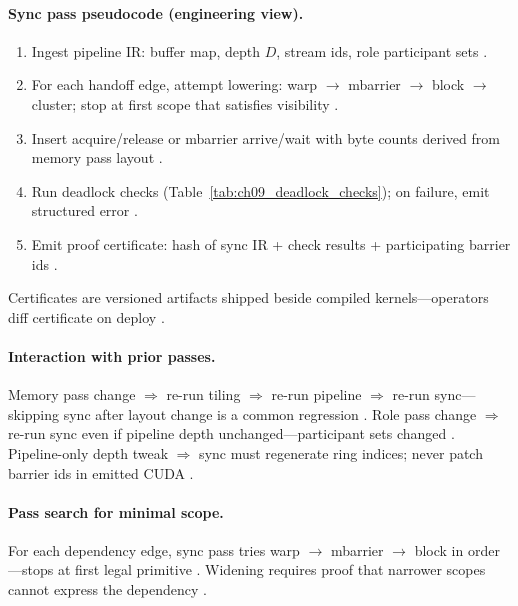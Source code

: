 \paragraph{Sync pass pseudocode (engineering view).}
\begin{enumerate}
\item Ingest pipeline IR: buffer map, depth $D$, stream ids, role participant sets \citep{yirage2026,semianalysis2024tma}.
\item For each handoff edge, attempt lowering: warp $\rightarrow$ mbarrier $\rightarrow$ block $\rightarrow$ cluster; stop at first scope that satisfies visibility \citep{shah2024flashattention3,nvidia2022hopper}.
\item Insert acquire/release or mbarrier arrive/wait with byte counts derived from memory pass layout \citep{dao2022flashattention,chen2020compilerbasedhardw}.
\item Run deadlock checks (Table~\ref{tab:ch09_deadlock_checks}); on failure, emit structured error \citep{wu2024mirage,yirage2026}.
\item Emit proof certificate: hash of sync IR + check results + participating barrier ids \citep{mpk2025,taxbreak2026}.
\end{enumerate}
Certificates are versioned artifacts shipped beside compiled kernels---operators diff certificate on deploy \citep{patel2025llminference,yirage2026}.

\paragraph{Interaction with prior passes.}
Memory pass change $\Rightarrow$ re-run tiling $\Rightarrow$ re-run pipeline $\Rightarrow$ re-run sync---skipping sync after layout change is a common regression \citep{wu2024mirage,yirage2026,dao2022flashattention}.
Role pass change $\Rightarrow$ re-run sync even if pipeline depth unchanged---participant sets changed \citep{shah2024flashattention3,mpk2025}.
Pipeline-only depth tweak $\Rightarrow$ sync must regenerate ring indices; never patch barrier ids in emitted CUDA \citep{semianalysis2024tma,chen2020compilerbasedhardw,taxbreak2026}.

\paragraph{Pass search for minimal scope.}
For each dependency edge, sync pass tries warp $\rightarrow$ mbarrier $\rightarrow$ block in order---stops at first legal primitive \citep{yirage2026,shah2024flashattention3,nvidia2022hopper,chen2020compilerbasedhardw}.
Widening requires proof that narrower scopes cannot express the dependency \citep{wu2024mirage,mpk2025,patel2025llminference}.

